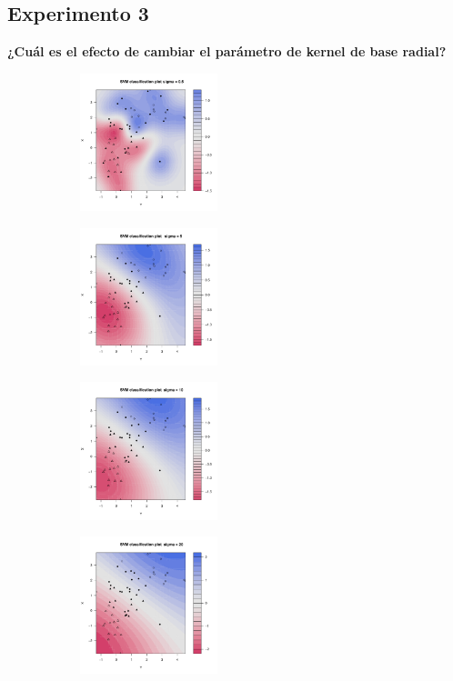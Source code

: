 \subsection*{Experimento 3}

\textbf{¿Cuál es el efecto de cambiar el parámetro de kernel de base radial?}

\begin{figure}[H]
	\centering
	\begin{subfigure}{4cm}
		\includegraphics[width=4cm]{Graphics/Problema_01/Experiment_03_1.pdf}
		\caption{}
	\end{subfigure}
	\begin{subfigure}{4cm}
		\includegraphics[width=4cm]{Graphics/Problema_01/Experiment_03_2.pdf}
		\caption{}
	\end{subfigure}
	\begin{subfigure}{4cm}
		\includegraphics[width=4cm]{Graphics/Problema_01/Experiment_03_3.pdf}
		\caption{}
	\end{subfigure}
	\begin{subfigure}{4cm}
		\includegraphics[width=4cm]{Graphics/Problema_01/Experiment_03_4.pdf}
		\caption{}
	\end{subfigure}
	\caption{}
\end{figure}

